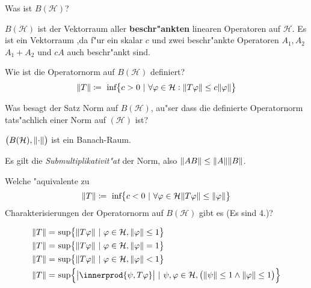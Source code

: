 \documentclass[9pt]{article}
\DeclarePairedDelimiter{\innerprod}\langle\rangle
\newcommand{\Hi}{\mathcal{H}}
\newenvironment{field}{}{\newpage}
\newif\ifnote
\newenvironment{note}{\notetrue}{\notefalse}
\newcommand{\localtag}{}
\newcommand{\globaltag}{}
\newcommand{\uuid}{}
\newcommand{\tags}[1]{
    \ifnote 
        \renewcommand{\localtag}{#1}
    \else
        \renewcommand{\globaltag}{#1}
    \fi 
    }
\newcommand{\xplain}[1]{\renewcommand{\uuid}{#1}}
\begin{document}
	\begin{note}
		\xplain{UUID}
		\tags{6.1.5, 6.1.6, 6.1.7, operatornorm}
		
		\begin{field}  %
			Was ist $B(\Hi)$? 
		\end{field}
		
		\begin{field}  %
			$B(\Hi)$ ist der Vektorraum aller \textbf{beschr"ankten} linearen Operatoren auf $\Hi$.
			Es ist ein Vektorraum ,da f"ur ein skalar $c$ und zwei beschr"ankte Operatoren $A_1, A_2$
			$A_1 + A_2$ und $cA$ auch beschr"ankt sind. 
		\end{field}
		
			
		\begin{field}  %
			Wie ist die Operatornorm auf $B(\Hi)$ definiert? 
		\end{field}
		\begin{field}  %
			\begin{equation*}
				\norm{T} \coloneqq \ \text{inf}\qty{c>0 \ | \ \forall \varphi \in \Hi: \norm{T\varphi} \leq c\norm{\varphi}}
			\end{equation*}
		\end{field}
			
		\begin{field}  %
			Was besagt der Satz Norm auf $B(\Hi)$, au"ser dass die definierte Operatornorm tats"achlich einer Norm auf $(\Hi)$ ist? 
		\end{field}
		
		\begin{field}  %
			$\qty(B(\Hi), \norm{\cdot})$ ist ein Banach-Raum.
			
			Es gilt die \textit{Submultiplikativit"at} der Norm, also $\norm{AB} \leq \norm{A}\norm{B}$.
		\end{field}
			
		\begin{field}  %
			Welche "aquivalente zu 
			\begin{equation*}
			\norm{T} \coloneqq \ \text{inf}\qty{c <0 \ | \ \forall \varphi \in \Hi
			\norm{T\varphi} \leq \norm{\varphi}}
			\end{equation*}
		 Charakterisierungen der Operatornorm auf $B(\Hi)$ gibt es (Es sind 4.)?
		\end{field}
		
		\begin{field}  %
			\begin{align*}
				\norm{T} =& \ \text{sup}\qty{\norm{T\varphi} \ | \ \varphi \in \Hi, \norm{\varphi} \leq 1} \\
				\norm{T} =& \ \text{sup}\qty{\norm{T\varphi} \ | \ \varphi \in \Hi, \norm{\varphi} = 1} \\
				\norm{T} =& \ \text{sup}\qty{\norm{T\varphi} \ | \ \varphi \in \Hi, \norm{\varphi} < 1} \\
				\norm{T} =& \ \text{sup}\qty{\abs{\innerprod{\psi, T\varphi}} \ | \ \psi, \varphi \in \Hi, \qty(\norm{\psi} \leq 1 \wedge \norm{\varphi} \leq 1)} \\
			\end{align*}
		\end{field}
	\end{note}
\end{document}
